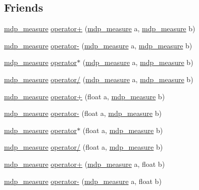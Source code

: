 \subsection*{Friends}
\begin{DoxyCompactItemize}
\item 
\hyperlink{classmdp__measure}{mdp\_\-measure} \hyperlink{classmdp__measure_a1550c5a752f0e131323a0571cb75a1ed}{operator+} (\hyperlink{classmdp__measure}{mdp\_\-measure} a, \hyperlink{classmdp__measure}{mdp\_\-measure} b)
\item 
\hyperlink{classmdp__measure}{mdp\_\-measure} \hyperlink{classmdp__measure_a4b29a5d9a8875501a415f73167d8c1ad}{operator-\/} (\hyperlink{classmdp__measure}{mdp\_\-measure} a, \hyperlink{classmdp__measure}{mdp\_\-measure} b)
\item 
\hyperlink{classmdp__measure}{mdp\_\-measure} \hyperlink{classmdp__measure_a51d0c9145c4abafae65590ed2076a438}{operator$\ast$} (\hyperlink{classmdp__measure}{mdp\_\-measure} a, \hyperlink{classmdp__measure}{mdp\_\-measure} b)
\item 
\hyperlink{classmdp__measure}{mdp\_\-measure} \hyperlink{classmdp__measure_a662fb1d8c18de9dc82182a67a082f24d}{operator/} (\hyperlink{classmdp__measure}{mdp\_\-measure} a, \hyperlink{classmdp__measure}{mdp\_\-measure} b)
\item 
\hyperlink{classmdp__measure}{mdp\_\-measure} \hyperlink{classmdp__measure_a46628db42ccf7c2dd255a4babe524da2}{operator+} (float a, \hyperlink{classmdp__measure}{mdp\_\-measure} b)
\item 
\hyperlink{classmdp__measure}{mdp\_\-measure} \hyperlink{classmdp__measure_ad0854fb690a3213c1263755d4cfbeb29}{operator-\/} (float a, \hyperlink{classmdp__measure}{mdp\_\-measure} b)
\item 
\hyperlink{classmdp__measure}{mdp\_\-measure} \hyperlink{classmdp__measure_a6d162e2b91ef6637df21622f658e13b9}{operator$\ast$} (float a, \hyperlink{classmdp__measure}{mdp\_\-measure} b)
\item 
\hyperlink{classmdp__measure}{mdp\_\-measure} \hyperlink{classmdp__measure_acac38148dfa66a6b1c40a18896778bbb}{operator/} (float a, \hyperlink{classmdp__measure}{mdp\_\-measure} b)
\item 
\hyperlink{classmdp__measure}{mdp\_\-measure} \hyperlink{classmdp__measure_aa394587b2c7e09685b687bcc2b78f9ba}{operator+} (\hyperlink{classmdp__measure}{mdp\_\-measure} a, float b)
\item 
\hyperlink{classmdp__measure}{mdp\_\-measure} \hyperlink{classmdp__measure_aa1d61cccc59a965eedf6ecb2fb877ea0}{operator-\/} (\hyperlink{classmdp__measure}{mdp\_\-measure} a, float b)

\end{DoxyCompactItemize}
